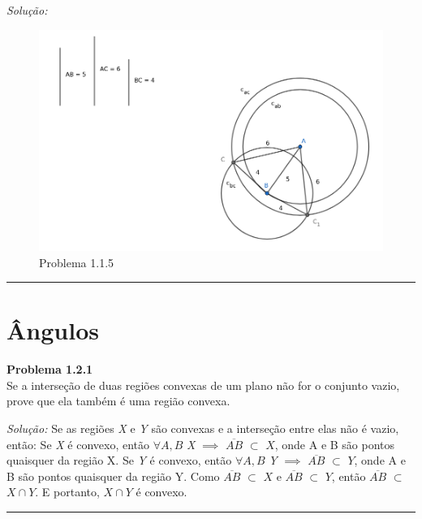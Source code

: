 \documentclass[a4paper, 11pt]{book}
\newenvironment{problem}[2][Problema] 
    { \begin{mdframed}[backgroundcolor=gray!20] \textbf{#1 #2} \\}
    {  \end{mdframed}}
\newenvironment{solution}
    {\textit{Solução:}}
    {}
\begin{document}
\begin{solution}
    \begin{figure}[H]
        \centering
        \includegraphics[scale=0.5]{imagens/1_1_5.png}
        \caption{Problema 1.1.5}
        \label{fig:1.1.5}
    \end{figure}
\end{solution}
    
\noindent\rule{7in}{2.8pt}
    
\section{Ângulos}

\begin{problem}{1.2.1}
    \label{prob:1.2.1}
Se a interseção de duas regiões convexas de um plano não for o conjunto vazio, prove que ela também é uma região convexa.
\end{problem}
\begin{solution}
    Se as regiões \textit{X} e \textit{Y} são convexas e a interseção entre elas não é vazio, então: \newline \newline
   Se \textit{X} é convexo, então $\forall A,B$ \in \textit{X} $\implies$ $\overline{AB}$ $\subset$ $X$, onde A e B são pontos quaisquer da região X. \newline 
   Se \textit{Y} é convexo, então $\forall A,B$ \in \textit{Y} $\implies$ $\overline{AB}$ $\subset$ $Y$, onde A e B são pontos quaisquer da região Y. \newline \newline
   Como $\overline{AB}$ $\subset$ $X$ e $\overline{AB}$ $\subset$ $Y$, então $\overline{AB}$ $\subset$ $X \cap Y$. E portanto, $X \cap Y$ é convexo.

\end{solution} 
\noindent\rule{7in}{2.8pt}\\
\end{document}
